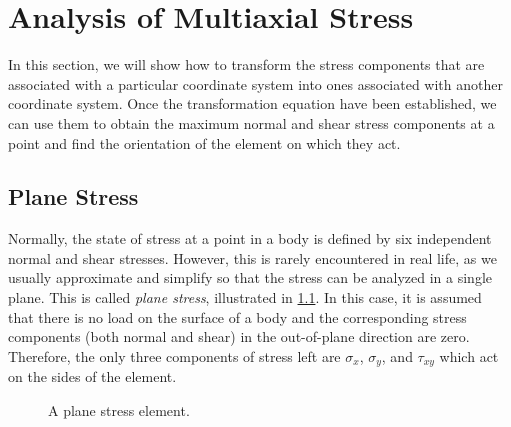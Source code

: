 \documentclass[
10pt,
a4paper,
openany,
svgnames,
]{book} %
\begin{document}

\chapter{Analysis of Multiaxial Stress} \label{chapter: multiaxial stress}

In this section, we will show how to transform the stress components that are associated with a particular coordinate system into ones associated with another coordinate system. Once the transformation equation have been established, we can use them to obtain the maximum normal and shear stress components at a point and find the orientation of the element on which they act.

\section{Plane Stress}

Normally, the state of stress at a point in a body is defined by six independent normal and shear stresses. However, this is rarely encountered in real life, as we usually approximate and simplify so that the stress can be analyzed in a single plane. This is called \emph{plane stress}, illustrated in \cref{fig: plane stress element}. In this case, it is assumed that there is no load on the surface of a body and the corresponding stress components (both normal and shear) in the out-of-plane direction are zero. Therefore, the only three components of stress left are $\sigma_x$, $\sigma_y$, and $\tau_{xy}$ which act on the sides of the element.

\begin{figure}[h]
  \centering
  \caption{A plane stress element.}
  \label{fig: plane stress element}
\end{figure}
\end{document}
